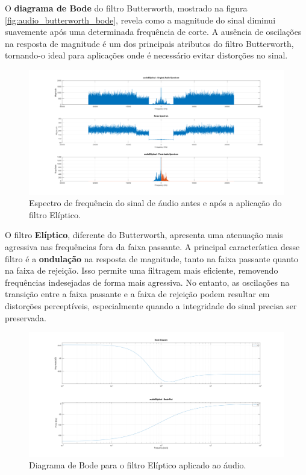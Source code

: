 O \textbf{diagrama de Bode} do filtro Butterworth, mostrado na figura \ref{fig:audio_butterworth_bode}, revela como a magnitude do sinal diminui suavemente após uma determinada frequência de corte. A ausência de oscilações na resposta de magnitude é um dos principais atributos do filtro Butterworth, tornando-o ideal para aplicações onde é necessário evitar distorções no sinal.

\begin{figure}[H]
    \centering
    \includegraphics[width=1\linewidth]{03_results/assets/audio_elliptical_spectrums.png}
    \caption{Espectro de frequência do sinal de áudio antes e após a aplicação do filtro Elíptico.}
    \label{fig:audio_elliptical_spectrums}
\end{figure}

O filtro \textbf{Elíptico}, diferente do Butterworth, apresenta uma atenuação mais agressiva nas frequências fora da faixa passante. A principal característica desse filtro é a \textbf{ondulação} na resposta de magnitude, tanto na faixa passante quanto na faixa de rejeição. Isso permite uma filtragem mais eficiente, removendo frequências indesejadas de forma mais agressiva. No entanto, as oscilações na transição entre a faixa passante e a faixa de rejeição podem resultar em distorções perceptíveis, especialmente quando a integridade do sinal precisa ser preservada.

\begin{figure}[H]
    \centering
    \includegraphics[width=1\linewidth]{03_results/assets/audio_elliptical_bode.png}
    \caption{Diagrama de Bode para o filtro Elíptico aplicado ao áudio.}
    \label{fig:audio_elliptical_bode}
\end{figure}

